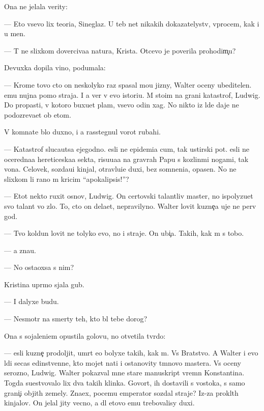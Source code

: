 \documentclass[10pt]{book}
\begin{document}
Ona ne jelala verity:

— Eto vsevo lix teori{\y}a, Sineglaz{\yi}{\y}. U teb{\ia} net nikakih dokazatelystv, vprocem, kak i u men{\ia}.

— T{\yi} ne slixkom doverciva{\y}a natura, Krista. Otcevo je poverila prohodim{\c}u?

Devuxka dopila vino, podumala:

— Krome tovo cto on neskolyko raz spasal mo{\y}u jizny, Walter oceny ubeditelen. {\Y}emu nujna pomo{\x} straja. I {\y}a ver{\io} v {\y}evo istori{\y}u. M{\yi} sto{\y}im na grani katastrof{\yi}, Ludwig. Do propasti, v kotoro{\y} buxu{\y}et plam{\ia}, vsevo odin xag. No nikto iz l{\io}de{\y} daje ne podozreva{\y}et ob etom.

V komnate b{\yi}lo duxno, i {\y}a rasstegnul vorot rubahi.

— Katastrof{\yi} sluca{\y}utsa {\y}ejegodno. {\Y}esli ne epidemi{\y}a cum{\yi}, tak {\y}ustirski{\y} pot. {\Y}esli ne oceredna{\y}a hereticeska{\y}a sekta, risu{\y}u{\x}a{\y}a na grav{\io}rah Papu s kozlin{\yi}\-mi nogami, tak vo{\y}na. Celovek, sozda{\y}u{\x}i{\y} kinjal{\yi}, otravl{\ia}{\y}u{\x}i{\y}e duxi, bez somneni{\y}a, opasen. No ne slixkom li rano m{\yi} kricim ``apokalipsis!''?

— Etot nekto ruxit osnov{\yi}, Ludwig. On certovski talantliv{\yi}{\y} master, no ispolyzu{\y}et svo{\y} talant vo zlo. To, cto on dela{\y}et, nepravilyno. Walter lovit kuzne{\c}a uje ne perv{\yi}{\y} god.

— Tvo{\y} koldun lovit ne tolyko {\y}evo, no i straje{\y}. On ubi{\y}{\c}a. Takih, kak m{\yi} s tobo{\y}.

— {\Y}a zna{\y}u.

— No osta{\y}oxsa s nim?

Kristina upr{\ia}mo sjala gub{\yi}.

— I dalyxe budu.

— Nesmotr{\ia} na smerty teh, kto b{\yi}l tebe dorog?

Ona s sojaleni{\y}em opustila golovu, no otvetila tv{\e}rdo:

— {\Y}esli kuzne{\c} prodoljit, umr{\e}t {\y}e{\x}o bolyxe takih, kak m{\yi}. Vs{\e} Bratstvo. A Walter i {\y}evo l{\io}di se{\y}cas {\y}edinstvenn{\yi}{\y}e, kto mojet na{\y}ti i ostanovity t{\e}mnovo mastera. Vs{\e} oceny ser{\y}ozno, Ludwig. Walter pokaz{\yi}val mne star{\yi}{\y}e manuskript{\yi} vrem{\e}n Konstantina. Togda su{\x}estvovalo lix dva takih klinka. Govor{\ia}t, ih dostavili s vostoka, s samo{\y} grani{\c}i objit{\yi}h zemely. Zna{\y}ex, pocemu emperator sozdal straje{\y}? Iz-za pro\-kl{\ia}\-t{\yi}h kinjalov. On jelal jity vecno, a dl{\ia} etovo {\y}emu trebovalisy duxi.
\end{document}

